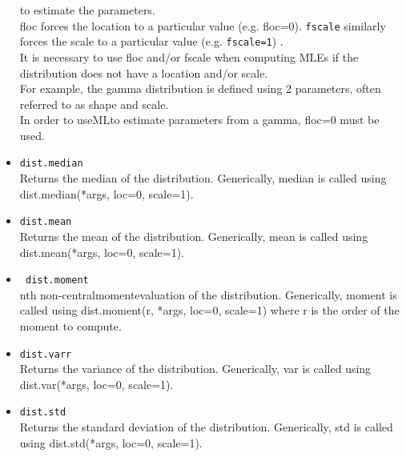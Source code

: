 \documentclass[Pydata.tex]{subfiles}
\begin{document}
\begin{itemize}
	to estimate the parameters. \\ floc forces the location to a particular value (e.g. floc=0). \texttt{fscale} similarly
	forces the scale to a particular value (e.g. \texttt{fscale=1}) .\\  It is necessary to use floc and/or fscale when
	computing MLEs if the distribution does not have a location and/or scale.\\ For example, the gamma distribution
	is defined using 2 parameters, often referred to as shape and scale. \\ In order to useMLto estimate
	parameters from a gamma, floc=0 must be used.
	\item \texttt{dist.median}\\
	Returns the median of the distribution. Generically, median is called using dist.median(*args, loc=0, scale=1).
	\item \texttt{dist.mean}\\
	Returns the mean of the distribution. Generically, mean is called using dist.mean(*args, loc=0, scale=1).
	\item\texttt{ dist.moment}\\
	nth non-centralmomentevaluation of the distribution. Generically, moment is called using dist.moment(r, *args,
	loc=0, scale=1) where r is the order of the moment to compute.
	\item \texttt{dist.varr}\\
	Returns the variance of the distribution. Generically, var is called using dist.var(*args, loc=0, scale=1).
	\item \texttt{dist.std}\\
	Returns the standard deviation of the distribution. Generically, std is called using dist.std(*args, loc=0, scale=1).
\end{itemize}
\newpage %
\end{document}

